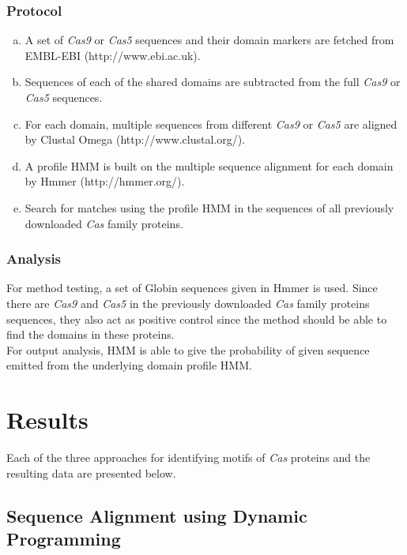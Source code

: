 \documentclass[11pt, oneside]{article}
\begin{document}
\subsubsection{Protocol}
\begin{enumerate}[a.]
\item A set of \textit{Cas9} or \textit{Cas5} sequences and their domain markers are fetched from EMBL-EBI (http://www.ebi.ac.uk).
\item Sequences of each of the shared domains are subtracted from the full \textit{Cas9} or \textit{Cas5} sequences.
\item For each domain, multiple sequences from different \textit{Cas9} or \textit{Cas5} are aligned by Clustal Omega (http://www.clustal.org/).
\item  A profile HMM is built on the multiple sequence alignment for each domain by Hmmer (http://hmmer.org/)\cite{hmmer}.
\item Search for matches using the profile HMM in the sequences of all previously downloaded \textit{Cas} family proteins.
\end{enumerate}


\subsubsection{Analysis}
For method testing, a set of Globin sequences given in Hmmer\cite{hmmer} is used. Since there are \textit{Cas9} and \textit{Cas5} in the previously downloaded \textit{Cas} family proteins sequences, they also act as positive control since the method should be able to find the domains in these proteins.\\
For output analysis, HMM is able to give the probability of given sequence emitted from the underlying domain profile HMM.





\section{Results}

Each of the three approaches for identifying motifs of \textit{Cas} proteins and the resulting data are presented below. 


\subsection{Sequence Alignment using Dynamic Programming}
\end{document}
